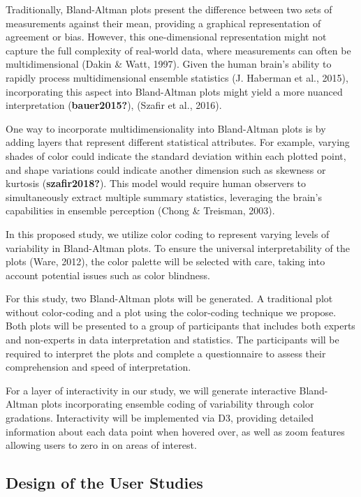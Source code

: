 \documentclass[print]{nuthesis}
\begin{document}
Traditionally, Bland-Altman plots present the difference between two sets of measurements against their mean, providing a graphical representation of agreement or bias.
However, this one-dimensional representation might not capture the full complexity of real-world data, where measurements can often be multidimensional (Dakin \& Watt, 1997).
Given the human brain's ability to rapidly process multidimensional ensemble statistics (J. Haberman et al., 2015), incorporating this aspect into Bland-Altman plots might yield a more nuanced interpretation (\textbf{bauer2015?}), (Szafir et al., 2016).

One way to incorporate multidimensionality into Bland-Altman plots is by adding layers that represent different statistical attributes.
For example, varying shades of color could indicate the standard deviation within each plotted point, and shape variations could indicate another dimension such as skewness or kurtosis (\textbf{szafir2018?}).
This model would require human observers to simultaneously extract multiple summary statistics, leveraging the brain's capabilities in ensemble perception (Chong \& Treisman, 2003).

In this proposed study, we utilize color coding to represent varying levels of variability in Bland-Altman plots.
To ensure the universal interpretability of the plots (Ware, 2012), the color palette will be selected with care, taking into account potential issues such as color blindness.

For this study, two Bland-Altman plots will be generated.
A traditional plot without color-coding and a plot using the color-coding technique we propose.
Both plots will be presented to a group of participants that includes both experts and non-experts in data interpretation and statistics.
The participants will be required to interpret the plots and complete a questionnaire to assess their comprehension and speed of interpretation.

For a layer of interactivity in our study, we will generate interactive Bland-Altman plots incorporating ensemble coding of variability through color gradations.
Interactivity will be implemented via D3, providing detailed information about each data point when hovered over, as well as zoom features allowing users to zero in on areas of interest.

\hypertarget{design-of-the-user-studies}{%
\subsection{Design of the User Studies}\label{design-of-the-user-studies}}
\end{document}
